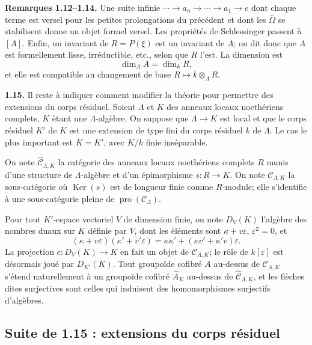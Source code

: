 \documentclass[11pt]{article}
\providecommand{\Ker}{\operatorname{Ker}}
\providecommand{\pro}{\operatorname{pro}}
\providecommand{\CL}{\mathcal C_\Lambda}
\providecommand{\CLK}{\mathcal C_{\Lambda,K}}
\begin{document}
\textbf{Remarques 1.12--1.14.} Une suite infinie $\cdots\to a_n\to\cdots\to a_1\to e$ dont chaque terme est versel pour les petites prolongations du pr\'ec\'edent et dont les $\bar\Omega$ se stabilisent donne un objet formel versel. Les propri\'et\'es de Schlessinger passent \`a $[A]$. Enfin, un invariant de $R=P(\xi)$ est un invariant de $A$; on dit donc que $A$ est formellement lisse, irr\'eductible, etc., selon que $R$ l'est. La dimension est
\[
\dim_\Lambda A=\dim_kR,
\]
et elle est compatible au changement de base $R\mapsto k\otimes_\Lambda R$.

\textbf{1.15.} Il reste \`a indiquer comment modifier la th\'eorie pour permettre des extensions du corps r\'esiduel. Soient $\Lambda$ et $K$ des anneaux locaux noeth\'eriens complets, $K$ \`etant une $\Lambda$-alg\`ebre. On suppose que $\Lambda\to K$ est local et que le corps r\'esiduel $K'$ de $K$ est une extension de type fini du corps r\'esiduel $k$ de $\Lambda$. Le cas le plus important est $K=K'$, avec $K/k$ finie ins\'eparable.

On note $\widehat{\mathcal C}_{\Lambda,K}$ la cat\'egorie des anneaux locaux noeth\'eriens complets $R$ munis d'une structure de $\Lambda$-alg\`ebre et d'un \'epimorphisme $s:R\to K$. On note $\CLK$ la sous-cat\'egorie o\`u $\Ker(s)$ est de longueur finie comme $R$-module; elle s'identifie \`a une sous-cat\'egorie pleine de $\pro(\CL)$.

Pour tout $K'$-espace vectoriel $V$ de dimension finie, on note $D_V(K)$ l'alg\`ebre des nombres duaux sur $K$ d\'efinie par $V$, dont les \`el\'ements sont $\kappa+v\varepsilon$, $\varepsilon^2=0$, et
\[
 (\kappa+v\varepsilon)(\kappa'+v'\varepsilon)=\kappa\kappa'+(\kappa v'+\kappa'v)\varepsilon.
\]
La projection $e:D_V(K)\to K$ en fait un objet de $\CLK$; le r\^ole de $k[\varepsilon]$ est d\'esormais jou\'e par $D_{K'}(K)$. Tout groupo\"ide cofibr\'e $A$ au-dessus de $\CLK$ s'\'etend naturellement \`a un groupo\"ide cofibr\'e $\widehat A_K$ au-dessus de $\widehat{\mathcal C}_{\Lambda,K}$, et les fl\`eches dites surjectives sont celles qui induisent des homomorphismes surjectifs d'alg\`ebres.




\providecommand{\Fl}{\operatorname{Fl}}
\providecommand{\coker}{\operatorname{coker}}
\providecommand{\Exal}{\operatorname{Exal}}


\subsection*{Suite de 1.15 : extensions du corps r\'esiduel}
\end{document}
